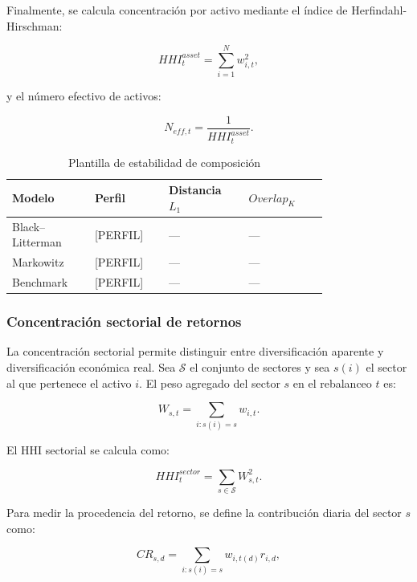 \documentclass[11pt]{article}
\begin{document}
Finalmente, se calcula concentraci\'on por activo mediante el \'indice de Herfindahl-Hirschman:

\begin{equation}
    HHI_t^{asset}
    =
    \sum_{i=1}^{N}
    w_{i,t}^{2},
\end{equation}

y el n\'umero efectivo de activos:

\begin{equation}
    N_{eff,t}
    =
    \frac{1}{HHI_t^{asset}}.
\end{equation}

\begin{table}[H]
\centering
\caption{Plantilla de estabilidad de composici\'on}
\begin{tabular}{p{0.20\linewidth} p{0.18\linewidth} p{0.20\linewidth} p{0.20\linewidth}}
\toprule
Modelo & Perfil & Distancia $L_1$ & $Overlap_K$ \\
\midrule
Black--Litterman & [PERFIL] & --- & --- \\
Markowitz & [PERFIL] & --- & --- \\
Benchmark & [PERFIL] & --- & --- \\
\bottomrule
\end{tabular}
\end{table}

\subsubsection{Concentraci\'on sectorial de retornos}

La concentraci\'on sectorial permite distinguir entre diversificaci\'on aparente y diversificaci\'on econ\'omica real. Sea $\mathcal{S}$ el conjunto de sectores y sea $s(i)$ el sector al que pertenece el activo $i$. El peso agregado del sector $s$ en el rebalanceo $t$ es:

\begin{equation}
    W_{s,t}
    =
    \sum_{i:s(i)=s}
    w_{i,t}.
\end{equation}

El HHI sectorial se calcula como:

\begin{equation}
    HHI_t^{sector}
    =
    \sum_{s \in \mathcal{S}}
    W_{s,t}^{2}.
\end{equation}

Para medir la procedencia del retorno, se define la contribuci\'on diaria del sector $s$ como:

\begin{equation}
    CR_{s,d}
    =
    \sum_{i:s(i)=s}
    w_{i,t(d)}
    r_{i,d},
\end{equation}
\end{document}
